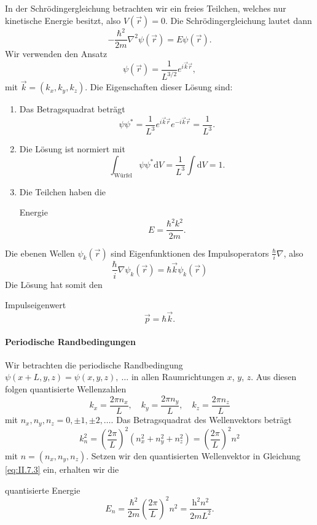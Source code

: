 	In der Schrödingergleichung betrachten wir ein freies Teilchen, welches nur kinetische Energie besitzt, also $V(\Vec{r}) = 0$. Die Schrödingergleichung lautet dann
	\begin{equation}
		\label{eq:II.7.1}
		-\frac{\hbar^2}{2m} \nabla ^2 \psi(\Vec{r}) = E \psi(\Vec{r}).
	\end{equation}
	Wir verwenden den Ansatz
	\begin{equation}
		\label{eq:II.7.2}
		\psi(\Vec{r}) = \frac{1}{L^{3 /2}} e^{i\Vec{k}\Vec{r}},
	\end{equation}
	mit $\Vec{k} = (k_{x}, k_{y}, k_{z})$. Die Eigenschaften dieser Lösung sind:
	\begin{enumerate}[label=\alph*)]
		\item Das Betragsquadrat beträgt
			$$
			\psi \psi^{*} = \frac{1}{L^3} e^{i\Vec{k}\Vec{r}}e^{-i\Vec{k}\Vec{r}} = \frac{1}{L^3}.
			$$ 
		\item Die Lösung ist normiert mit
			$$
			\int_{\text{Würfel}} \psi \psi^{*} \mathrm{d}V = \frac{1}{L^3} \int \mathrm{d}V = 1.
			$$ 
		\item Die Teilchen haben die
			\begin{important}
				Energie
				\begin{equation}
					\label{eq:II.7.3}
					E = \frac{\hbar ^2 k^2}{2m}.
				\end{equation}
			\end{important} 
			
	\end{enumerate}
	Die ebenen Wellen $\psi_{k}(\Vec{r})$ sind Eigenfunktionen des Impulsoperators $\frac{\hbar }{i} \nabla $, also
	$$
	\frac{\hbar}{i} \nabla \psi_{k} (\Vec{r}) = \hbar \Vec{k} \psi_{k} (\Vec{r})
	$$
	Die Lösung hat somit den
	\begin{important}
		Impulseigenwert
		$$
		\Vec{p} = \hbar \Vec{k}.
		$$ 
	\end{important}


\paragraph{Periodische Randbedingungen} 
	Wir betrachten die periodische Randbedingung \\${\psi(x+L, y, z) = \psi (x,y,z),~\ldots}$ in allen Raumrichtungen $x$, $y$, $z$.
	Aus diesen folgen quantisierte Wellenzahlen
	$$
	k_{x} = \frac{2 \pi n_{x}}{L}, \quad k_{y} = \frac{2\pi n_{y}}{L}, \quad k_{z} = \frac{2\pi n_{z}}{L}
	$$ 
	mit $n_{x},n_{y}, n_{z}= 0, \pm 1, \pm 2,\ldots$. 
	Das Betragsquadrat des Wellenvektors beträgt
	$$
	k_{n}^2 = \left( \frac{2\pi}{L} \right) ^2 \left( n_{x}^2 + n_{y}^2 + n_{z}^2 \right) = \left( \frac{2\pi}{L} \right) ^2 n^2
	$$
	mit $n = (n_x, n_y, n_z)$. Setzen wir den quantisierten Wellenvektor in Gleichung \eqref{eq:II.7.3} ein, erhalten wir die 
	\begin{important}
		quantisierte Energie
		\begin{equation}
			\label{eq:II.7.4}
			E_{n}= \frac{\hbar^2}{2m} \left( \frac{2\pi}{L} \right) ^2 n^2 = \frac{\mathrm h^2 n^2}{2mL^2}.
		\end{equation}
	\end{important}

